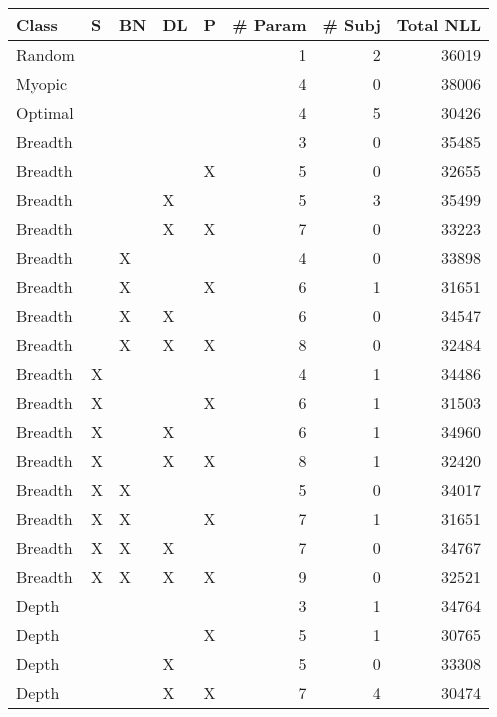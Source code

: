 \begin{tabular}{lllllrrr}
\toprule
   Class &  S & BN & DL &  P &  \# Param &  \# Subj &  Total NLL \\
\midrule
  Random &    &    &    &    &        1 &       2 &      36019 \\
  Myopic &    &    &    &    &        4 &       0 &      38006 \\
 Optimal &    &    &    &    &        4 &       5 &      30426 \\
 Breadth &    &    &    &    &        3 &       0 &      35485 \\
 Breadth &    &    &    &  X &        5 &       0 &      32655 \\
 Breadth &    &    &  X &    &        5 &       3 &      35499 \\
 Breadth &    &    &  X &  X &        7 &       0 &      33223 \\
 Breadth &    &  X &    &    &        4 &       0 &      33898 \\
 Breadth &    &  X &    &  X &        6 &       1 &      31651 \\
 Breadth &    &  X &  X &    &        6 &       0 &      34547 \\
 Breadth &    &  X &  X &  X &        8 &       0 &      32484 \\
 Breadth &  X &    &    &    &        4 &       1 &      34486 \\
 Breadth &  X &    &    &  X &        6 &       1 &      31503 \\
 Breadth &  X &    &  X &    &        6 &       1 &      34960 \\
 Breadth &  X &    &  X &  X &        8 &       1 &      32420 \\
 Breadth &  X &  X &    &    &        5 &       0 &      34017 \\
 Breadth &  X &  X &    &  X &        7 &       1 &      31651 \\
 Breadth &  X &  X &  X &    &        7 &       0 &      34767 \\
 Breadth &  X &  X &  X &  X &        9 &       0 &      32521 \\
   Depth &    &    &    &    &        3 &       1 &      34764 \\
   Depth &    &    &    &  X &        5 &       1 &      30765 \\
   Depth &    &    &  X &    &        5 &       0 &      33308 \\
   Depth &    &    &  X &  X &        7 &       4 &      30474 \\

\end{tabular}
